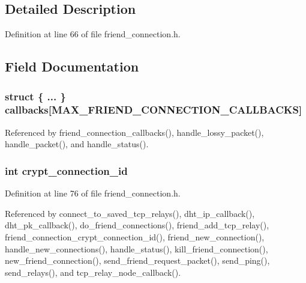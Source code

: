 \subsection{Detailed Description}


Definition at line 66 of file friend\+\_\+connection.\+h.



\subsection{Field Documentation}
\hypertarget{struct_friend___conn_a213983130190a8281ab689630f0aee97}{
\subsubsection[{callbacks}]{\setlength{\rightskip}{0pt plus 5cm}struct \{ ... \}   callbacks\mbox{[}{\bf M\+A\+X\+\_\+\+F\+R\+I\+E\+N\+D\+\_\+\+C\+O\+N\+N\+E\+C\+T\+I\+O\+N\+\_\+\+C\+A\+L\+L\+B\+A\+C\+K\+S}\mbox{]}}}\label{struct_friend___conn_a213983130190a8281ab689630f0aee97}


Referenced by friend\+\_\+connection\+\_\+callbacks(), handle\+\_\+lossy\+\_\+packet(), handle\+\_\+packet(), and handle\+\_\+status().

\hypertarget{struct_friend___conn_a5ca114d88c26607a45883173f86c7c20}{
\subsubsection[{crypt\+\_\+connection\+\_\+id}]{\setlength{\rightskip}{0pt plus 5cm}int crypt\+\_\+connection\+\_\+id}}\label{struct_friend___conn_a5ca114d88c26607a45883173f86c7c20}


Definition at line 76 of file friend\+\_\+connection.\+h.



Referenced by connect\+\_\+to\+\_\+saved\+\_\+tcp\+\_\+relays(), dht\+\_\+ip\+\_\+callback(), dht\+\_\+pk\+\_\+callback(), do\+\_\+friend\+\_\+connections(), friend\+\_\+add\+\_\+tcp\+\_\+relay(), friend\+\_\+connection\+\_\+crypt\+\_\+connection\+\_\+id(), friend\+\_\+new\+\_\+connection(), handle\+\_\+new\+\_\+connections(), handle\+\_\+status(), kill\+\_\+friend\+\_\+connection(), new\+\_\+friend\+\_\+connection(), send\+\_\+friend\+\_\+request\+\_\+packet(), send\+\_\+ping(), send\+\_\+relays(), and tcp\+\_\+relay\+\_\+node\+\_\+callback().


